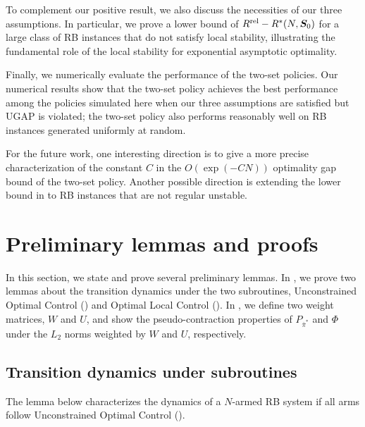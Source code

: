 \documentclass[11pt,letterpaper]{article}
\theoremstyle{plain}
\theoremstyle{definition}
\theoremstyle{remark}
\newcommand{\ve}[1]{\bm{#1}}
\newcommand{\veS}{\ve{S}}
\newcommand{\rel}{\textup{rel}} %
\newcommand{\ravg}{R}
\newcommand{\ropt}{\ravg^*(N, \veS_0)}
\newcommand{\rrel}{\ravg^\rel}
\newcommand{\pibar}{{\sysbar{\pi}}}
\newcommand{\pibs}{{\pibar^*}}
\newcommand{\sysbar}[1]{\bar{#1}}
\newcommand{\wmat}{W}
\newcommand{\umat}{U}
\begin{document}
To complement our positive result, we also discuss the necessities of our three assumptions. In particular, we prove a lower bound of $\rrel - \ropt$ for a large class of RB instances that do not satisfy local stability, illustrating the fundamental role of the local stability for exponential asymptotic optimality. 

Finally, we numerically evaluate the performance of the two-set policies. Our numerical results show that the two-set policy achieves the best performance among the policies simulated here when our three assumptions are satisfied but UGAP is violated; the two-set policy also performs reasonably well on RB instances generated uniformly at random. 


For the future work, one interesting direction is to give a more precise characterization of the constant $C$ in the $O(\exp(-CN))$ optimality gap bound of the two-set policy. Another possible direction is extending the lower bound in  to RB instances that are not regular unstable. 






\appendix



\section{Preliminary lemmas and proofs}\label{app:preliminary-proofs}
In this section, we state and prove several preliminary lemmas. 
In , we prove two lemmas about the transition dynamics under the two subroutines, Unconstrained Optimal Control () and Optimal Local Control (). 
In , we define two weight matrices, $\wmat$ and $\umat$, and show the pseudo-contraction properties of $P_\pibs$ and $\Phi$ under the $L_2$ norms weighted by $\wmat$ and $\umat$, respectively.



\subsection{Transition dynamics under subroutines}\label{app:subroutine-transition-lemmas}


The lemma below characterizes the dynamics of a $N$-armed RB system if all arms follow Unconstrained Optimal Control (). 
\end{document}
